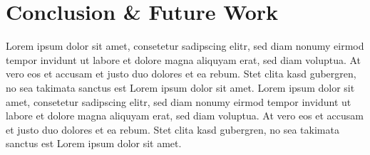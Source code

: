 \documentclass[11pt,a4paper,twoside,openright]{report}
\begin{document}
\chapter{Conclusion \& Future Work}
\label{sec:concl}

Lorem ipsum dolor sit amet, consetetur sadipscing elitr, sed diam nonumy
eirmod tempor invidunt ut labore et dolore magna aliquyam erat, sed diam voluptua. At
vero eos et accusam et justo duo dolores et ea rebum. Stet clita kasd gubergren, no sea
takimata sanctus est Lorem ipsum dolor sit amet. Lorem ipsum dolor sit amet, consetetur
sadipscing elitr, sed diam nonumy eirmod tempor invidunt ut labore et dolore magna
aliquyam erat, sed diam voluptua. At vero eos et accusam et justo duo dolores et ea
rebum. Stet clita kasd gubergren, no sea takimata sanctus est Lorem ipsum dolor sit amet.






\end{document}
